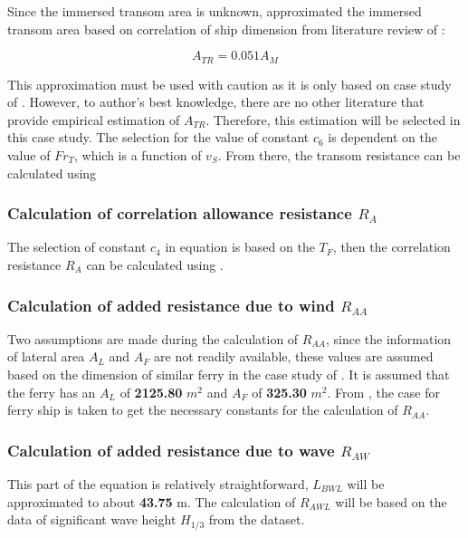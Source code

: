 Since the immersed transom area is unknown,  approximated the immersed transom area based on correlation of ship dimension from literature review of :

\begin{equation}
    \label{eqn:A_TR}
    A_{TR} = 0.051 A_M
\end{equation}

This approximation must be used with caution as it is only based on case study of . However, to author's best knowledge, there are no other literature that provide empirical estimation of $A_{TR}$. Therefore, this estimation will be selected in this case study. The selection for the value of constant $c_6$ is dependent on the value of $Fr_T$, which is a function of $v_S$. From there, the transom resistance can be calculated using 

\subsubsection*{Calculation of correlation allowance resistance $R_A$}

The selection of constant $c_4$ in equation  is based on the $T_F$, then the correlation resistance $R_A$ can be calculated using .

\subsubsection*{Calculation of added resistance due to wind $R_{AA}$}

Two assumptions are made during the calculation of $R_{AA}$, since the information of lateral area $A_L$ and $A_F$ are not readily available, these values are assumed based on the dimension of similar ferry in the case study of . It is assumed that the ferry has an $A_L$ of \textbf{2125.80} $m^2$ and $A_F$ of \textbf{325.30} $m^2$. From , the case for ferry ship is taken to get the necessary constants for the calculation of $R_{AA}$. 

\subsubsection*{Calculation of added resistance due to wave $R_{AW}$ }

This part of the equation is relatively straightforward, $L_{BWL}$ will be approximated to about \textbf{43.75} m. The calculation of $R_{AWL}$ will be based on the data of significant wave height $H_{1/3}$ from the dataset.


